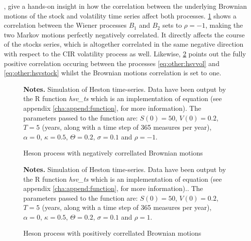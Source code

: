 \documentclass[12pt,a4paper]{report}
\begin{document}
, give a hands-on insight in how the correlation between the underlying Brownian motions of the stock and volatility time series affect both processes.
\cref{p:other:uncorrelatedheston} shows a correlation between the Wiener processes $B_1$ and $B_2$ sets to $\rho = -1$, making the two Markov motions perfectly negatively correlated. 
It directly affects the course of the stocks series, which is altogether correlated in the same negative direction with respect to the CIR volatility process as well.
Likewise, \cref{p:other:correlatedheston} points out the fully positive correlation occuring between the processes \ref{eq:other:hsvvol} and \ref{eq:other:hsvstock} whilst the Brownian motions correlation is set to one. 

\begin{figure}[ht]
\centering
 
  \begin{changemargin}{0.5cm}{0.5cm}
  \medskip
\footnotesize
{}\textbf{Notes.} Simulation of Heston time-series. Data have been output by the R function \textit{hsv\_ts} which is an implementation of equation  (see appendix \ref{cha:append:function}, for more information). The parameters passed to the function are:  $S(0) = 50$,  $V(0) = 0.2$,  $T = 5$ (years, along with a time step of 365 measures per year),  $\alpha = 0$,  $\kappa = 0.5$,  $\Theta = 0.2$,  $\sigma = 0.1$ and $\rho = -1$.  
\end{changemargin}
\caption{Heson process with negatively correllated Brownian motions}
\label{p:other:uncorrelatedheston}
\end{figure}


\begin{figure}[ht]
\centering

\caption{Heson process with positively correllated Brownian motions}
  \begin{changemargin}{0.5cm}{0.5cm}
  \medskip
\footnotesize
{}\textbf{Notes.} Simulation of Heston time-series. Data have been output by the R function \textit{hsv\_ts} which is an implementation of equation  (see appendix \ref{cha:append:function}, for more information).. The parameters passed to the function are:  $S(0) = 50$,  $V(0) = 0.2$,  $T = 5$ (years, along with a time step of 365 measures per year),  $\alpha = 0$,  $\kappa = 0.5$,  $\Theta = 0.2$,  $\sigma = 0.1$ and $\rho = 1$.  
\end{changemargin}
\label{p:other:correlatedheston}
\end{figure}
\end{document}
